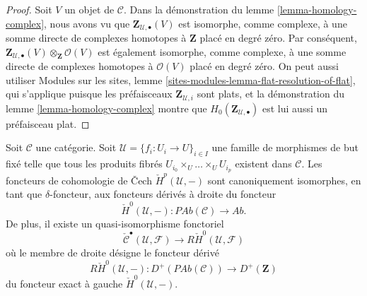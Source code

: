 \begin{proof}
Soit $V$ un objet de $\mathcal{C}$.
Dans la démonstration du lemme \ref{lemma-homology-complex}, nous avons vu que
$\mathbf{Z}_{\mathcal{U}, \bullet}(V)$ est isomorphe, comme complexe,
à une somme directe de complexes homotopes à $\mathbf{Z}$
placé en degré zéro. Par conséquent,
$\mathbf{Z}_{\mathcal{U}, \bullet}(V) \otimes_\mathbf{Z} \mathcal{O}(V)$
est également isomorphe, comme complexe, à une somme directe de complexes homotopes
à $\mathcal{O}(V)$ placé en degré zéro.
On peut aussi utiliser
Modules sur les sites, lemme \ref{sites-modules-lemma-flat-resolution-of-flat},
qui s'applique puisque les préfaisceaux $\mathbf{Z}_{\mathcal{U}, i}$ sont plats,
et la démonstration du lemme \ref{lemma-homology-complex} montre que
$H_0(\mathbf{Z}_{\mathcal{U}, \bullet})$ est lui aussi un préfaisceau plat.
\end{proof}

\begin{lemma}
\label{lemma-cech-cohomology-derived-presheaves}
Soit $\mathcal{C}$ une catégorie. Soit
$\mathcal{U} = \{f_i : U_i \to U\}_{i \in I}$ une famille de morphismes
de but fixé telle que tous les produits fibrés
$U_{i_0} \times_U \ldots \times_U U_{i_p}$ existent dans $\mathcal{C}$.
Les foncteurs de cohomologie de {\v C}ech $\check{H}^p(\mathcal{U}, -)$
sont canoniquement isomorphes, en tant que $\delta$-foncteur, aux
foncteurs dérivés à droite du foncteur
$$
\check{H}^0(\mathcal{U}, -) :
\textit{PAb}(\mathcal{C})
\longrightarrow
\textit{Ab}.
$$
De plus, il existe un quasi-isomorphisme fonctoriel
$$
\check{\mathcal{C}}^\bullet(\mathcal{U}, \mathcal{F})
\longrightarrow
R\check{H}^0(\mathcal{U}, \mathcal{F})
$$
où le membre de droite désigne le foncteur dérivé
$$
R\check{H}^0(\mathcal{U}, -) :
D^{+}(\textit{PAb}(\mathcal{C}))
\longrightarrow
D^{+}(\mathbf{Z})
$$
du foncteur exact à gauche $\check{H}^0(\mathcal{U}, -)$.
\end{lemma}

